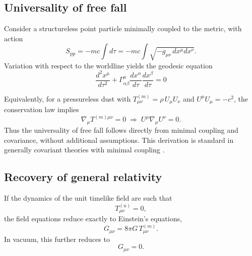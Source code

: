 \documentclass[11pt]{article}
\begin{document}
    \subsection{Universality of free fall}

        Consider a structureless point particle minimally coupled to the metric,
        with action
        \begin{equation}
            S_{\mathrm{pp}} = -mc \int d\tau
            = -mc \int \sqrt{-g_{\mu\nu}\,dx^\mu dx^\nu} .
        \end{equation}
        Variation with respect to the worldline yields the geodesic equation
        \begin{equation}
            \boxed{
            \frac{d^2 x^\mu}{d\tau^2}
            +
            \Gamma^\mu_{\alpha\beta}
            \frac{dx^\alpha}{d\tau}
            \frac{dx^\beta}{d\tau}
            = 0
            }
        \end{equation}

        Equivalently, for a pressureless dust with
        $T^{(m)}_{\mu\nu} = \rho\, U_\mu U_\nu$ and $U^\mu U_\mu = -c^2$, the conservation
        law implies
        \begin{equation}
            \nabla_\mu T^{(m)\mu\nu} = 0
            \;\Rightarrow\;
            U^\mu \nabla_\mu U^\nu = 0 .
        \end{equation}
        Thus the universality of free fall follows directly from minimal coupling and
        covariance, without additional assumptions.
        This derivation is standard in generally covariant theories with minimal
        coupling \cite{weinberg1972}.

    \subsection{Recovery of general relativity}

        If the dynamics of the unit timelike field are such that
        \begin{equation}
            T^{(u)}_{\mu\nu} = 0 ,
        \end{equation}
        the field equations reduce exactly to Einstein’s equations,
        \begin{equation}
            G_{\mu\nu} = 8\pi G\, T^{(m)}_{\mu\nu} .
        \end{equation}
        In vacuum, this further reduces to
        \begin{equation}
            G_{\mu\nu} = 0 .
        \end{equation}
\end{document}
